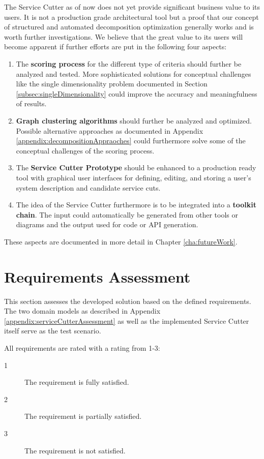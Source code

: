 The Service Cutter as of now does not yet provide significant business value to its users. It is not a production grade architectural tool but a proof that our concept of structured and automated decomposition optimization generally works and is worth further investigations. We believe that the great value to its users will become apparent if further efforts are put in the following four aspects:

\begin{enumerate}
	\item The \textbf{scoring process} for the different type of criteria should further be analyzed and tested. More sophisticated solutions for conceptual challenges like the single dimensionality problem documented in Section \ref{subsec:singleDimensionality} could improve the accuracy and meaningfulness of results. 
	\item \textbf{Graph clustering algorithms} should further be analyzed and optimized. Possible alternative approaches as documented in Appendix \ref{appendix:decompositionAppraoches} could furthermore solve some of the conceptual challenges of the scoring process.
	\item The \textbf{Service Cutter Prototype} should be enhanced to a production ready tool with graphical user interfaces for defining, editing, and storing a user's system description and candidate service cuts.
	\item The idea of the Service Cutter furthermore is to be integrated into a \textbf{toolkit chain}. The input could automatically be generated from other tools or diagrams and the output used for code or \gls{API} generation. 
\end{enumerate}

These aspects are documented in more detail in Chapter \ref{cha:futureWork}.

\section{Requirements Assessment}

This section assesses the developed solution based on the defined requirements. The two domain models as described in Appendix \ref{appendix:serviceCutterAssessment} as well as the implemented Service Cutter itself serve as the test scenario.

All requirements are rated with a rating from 1-3:

\begin{description}
\item[1] The requirement is fully satisfied.
\item[2] The requirement is partially satisfied.
\item[3] The requirement is not satisfied.
\end{description}

